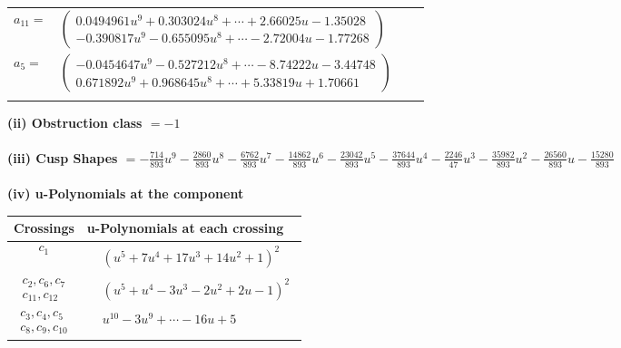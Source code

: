 \documentclass[1p]{elsarticle_modified}
\theoremstyle{definition}
\begin{document}
\begin{tabular}{m{7pt} m{180pt} m{7pt} m{180pt} }
\flushright $a_{11}=$&$\begin{pmatrix}0.0494961 u^{9}+0.303024 u^{8}+\cdots+2.66025 u-1.35028\\-0.390817 u^{9}-0.655095 u^{8}+\cdots-2.72004 u-1.77268\end{pmatrix}$ \\
\flushright $a_{5}=$&$\begin{pmatrix}-0.0454647 u^{9}-0.527212 u^{8}+\cdots-8.74222 u-3.44748\\0.671892 u^{9}+0.968645 u^{8}+\cdots+5.33819 u+1.70661\end{pmatrix}$\\&\end{tabular}
\flushleft \textbf{(ii) Obstruction class $= -1$}\\~\\
\flushleft \textbf{(iii) Cusp Shapes $= -\frac{714}{893} u^9-\frac{2860}{893} u^8-\frac{6762}{893} u^7-\frac{14862}{893} u^6-\frac{23042}{893} u^5-\frac{37644}{893} u^4-\frac{2246}{47} u^3-\frac{35982}{893} u^2-\frac{26560}{893} u-\frac{15280}{893}$}\\~\\
\newpage\renewcommand{\arraystretch}{1}
\flushleft \textbf{(iv) u-Polynomials at the component}\newline \\
\begin{tabular}{m{50pt}|m{274pt}}
Crossings & \hspace{64pt}u-Polynomials at each crossing \\
\hline $$\begin{aligned}c_{1}\end{aligned}$$&$\begin{aligned}
&(u^5+7 u^4+17 u^3+14 u^2+1)^2
\end{aligned}$\\
\hline $$\begin{aligned}c_{2},c_{6},c_{7}\\c_{11},c_{12}\end{aligned}$$&$\begin{aligned}
&(u^5+u^4-3 u^3-2 u^2+2 u-1)^2
\end{aligned}$\\
\hline $$\begin{aligned}c_{3},c_{4},c_{5}\\c_{8},c_{9},c_{10}\end{aligned}$$&$\begin{aligned}
&u^{10}-3 u^9+\cdots-16 u+5
\end{aligned}$\\
\hline
\end{tabular}\\~\\
\end{document}
